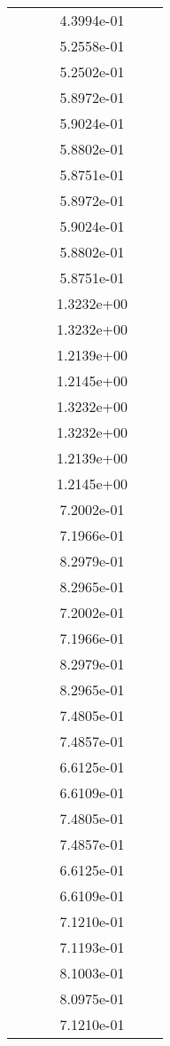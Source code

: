 \begin{xltabular}{\textwidth}{r|rS[table-format=1.3e+2]S[table-format=1.4e+2]S[table-format=1.4e+2]S[table-format=-1.5]}
&  &  & 4.3994e-01 & & \\
&  &  & 5.2558e-01 & & \\
&  &  & 5.2502e-01 & & \\
&  &  & 5.8972e-01 & & \\
&  &  & 5.9024e-01 & & \\
&  &  & 5.8802e-01 & & \\
&  &  & 5.8751e-01 & & \\
&  &  & 5.8972e-01 & & \\
&  &  & 5.9024e-01 & & \\
&  &  & 5.8802e-01 & & \\
&  &  & 5.8751e-01 & & \\
&  &  & 1.3232e+00 & & \\
&  &  & 1.3232e+00 & & \\
&  &  & 1.2139e+00 & & \\
&  &  & 1.2145e+00 & & \\
&  &  & 1.3232e+00 & & \\
&  &  & 1.3232e+00 & & \\
&  &  & 1.2139e+00 & & \\
&  &  & 1.2145e+00 & & \\
&  &  & 7.2002e-01 & & \\
&  &  & 7.1966e-01 & & \\
&  &  & 8.2979e-01 & & \\
&  &  & 8.2965e-01 & & \\
&  &  & 7.2002e-01 & & \\
&  &  & 7.1966e-01 & & \\
&  &  & 8.2979e-01 & & \\
&  &  & 8.2965e-01 & & \\
&  &  & 7.4805e-01 & & \\
&  &  & 7.4857e-01 & & \\
&  &  & 6.6125e-01 & & \\
&  &  & 6.6109e-01 & & \\
&  &  & 7.4805e-01 & & \\
&  &  & 7.4857e-01 & & \\
&  &  & 6.6125e-01 & & \\
&  &  & 6.6109e-01 & & \\
&  &  & 7.1210e-01 & & \\
&  &  & 7.1193e-01 & & \\
&  &  & 8.1003e-01 & & \\
&  &  & 8.0975e-01 & & \\
&  &  & 7.1210e-01 & & \\

\end{xltabular}

